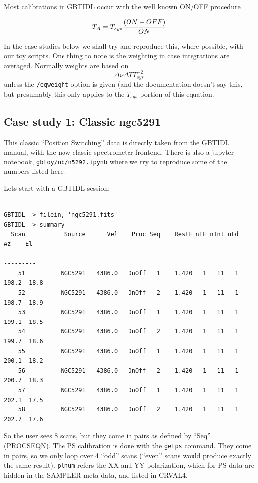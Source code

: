 \documentclass[12pt,a4paper]{article}
\begin{document}
Most calibrations in GBTIDL occur with the well known ON/OFF procedure

$$
T_A = T_{sys} { { (ON-OFF)} \over {ON} }
$$

In the case studies below we shall try and reproduce this, where possible, with our toy scripts.
One thing to note is the weighting in case integrations are averaged. Normally weights are based on
$$
       \Delta\nu \Delta T T_{sys}^{-2}
$$
       unless the {\tt /eqweight} option is given (and the documentation doesn't say this, but presumably
       this only applies to the $T_{sys}$ portion of this equation.

\subsection{Case study 1: Classic ngc5291}

This classic ``Position Switching'' data is directly taken from the GBTIDL manual,
with the now classic spectrometer frontend.  There is also a jupyter notebook,
{\tt gbtoy/nb/n5292.ipynb} where we try to reproduce some of the numbers listed here.


Lets start with a GBTIDL session:

\footnotesize
\begin{lstlisting}

GBTIDL -> filein, 'ngc5291.fits' 
GBTIDL -> summary
  Scan           Source      Vel    Proc Seq    RestF nIF nInt nFd     Az    El
-------------------------------------------------------------------------------
    51          NGC5291   4386.0   OnOff   1    1.420   1   11   1  198.2  18.8
    52          NGC5291   4386.0   OnOff   2    1.420   1   11   1  198.7  18.9
    53          NGC5291   4386.0   OnOff   1    1.420   1   11   1  199.1  18.5
    54          NGC5291   4386.0   OnOff   2    1.420   1   11   1  199.7  18.6
    55          NGC5291   4386.0   OnOff   1    1.420   1   11   1  200.1  18.2
    56          NGC5291   4386.0   OnOff   2    1.420   1   11   1  200.7  18.3
    57          NGC5291   4386.0   OnOff   1    1.420   1   11   1  202.1  17.5
    58          NGC5291   4386.0   OnOff   2    1.420   1   11   1  202.7  17.6
\end{lstlisting}
\normalsize

So the user sees 8 scans, but they come in pairs as defined by ``Seq'' (PROCSEQN).  The
PS calibration is done with the {\tt getps} command. They come in pairs, so we only
loop over 4 ``odd'' scans (``even'' scans would produce exactly the same result).
{\tt plnum} refers the XX and YY polarization, which for PS data are hidden in the SAMPLER
meta data, and listed in CRVAL4.
\end{document}
